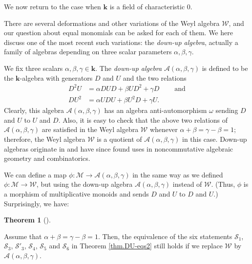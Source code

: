 \documentclass[numbers=enddot,12pt,final,onecolumn,notitlepage]{scrartcl}%
\theoremstyle{definition}
\newtheorem{theo}{Theorem}[section]
\newenvironment{theorem}[1][]
{\begin{theo}[#1]\begin{leftbar}}
{\end{leftbar}\end{theo}}
\newcommand{\W}{\mathcal{W}}
\newcommand{\M}{\mathcal{M}}
\newcommand{\kk}{\mathbf{k}}
\begin{document}
We now return to the case when $\kk$ is a field of characteristic $0$.

There are several deformations and other variations of the Weyl algebra
$\W$, and our question about equal monomials can be asked for each of
them. We  here discuss one of the most recent such variations: the
\emph{down-up algebra}, actually a family of algebras depending on three
scalar parameters $\alpha,\beta,\gamma$.

We fix three scalars $\alpha,\beta,\gamma\in\kk$. The \emph{down-up
algebra} $\mathcal{A}\left(  \alpha,\beta,\gamma\right)  $ is defined to be
the $\kk$-algebra with generators $D$ and $U$ and the two relations%
\begin{align*}
D^{2}U  & =\alpha DUD+\beta UD^{2}+\gamma D\ \ \ \ \ \ \ \ \ \ \text{and}\\
DU^{2}  & =\alpha UDU+\beta U^{2}D+\gamma U.
\end{align*}
Clearly, this algebra $\mathcal{A}\left(  \alpha,\beta,\gamma\right)  $ has an
algebra anti-automorphism $\omega$ sending $D$ and $U$ to $U$ and $D$. Also,
it is easy to check that the above two relations of $\mathcal{A}\left(
\alpha,\beta,\gamma\right)  $ are satisfied in the Weyl algebra $\W$
whenever $\alpha+\beta=\gamma-\beta=1$; therefore, the Weyl algebra
$\W$ is a quotient of $\mathcal{A}\left(  \alpha,\beta,\gamma\right)
$ in this case. Down-up algebras originate in \cite[Proposition 3.5]{BenRob98}
and have since found uses in noncommutative algebraic geometry and combinatorics.

We can define a map $\phi : \M \to \mathcal{A}\left(
\alpha,\beta,\gamma\right)  $ in the same way as we defined $\phi
: \M \to \W$, but using the down-up algebra
$\mathcal{A}\left(  \alpha,\beta,\gamma\right)  $ instead of $\W$.
(Thus, $\phi$ is a morphism of multiplicative monoids and sends $D$ and $U$ to
$D$ and $U$.) Surprisingly, we have:

\begin{theorem}
\label{thm.dua.equiv}
Assume that $\alpha+\beta=\gamma-\beta=1$. Then, the
equivalence of the six statements $\mathcal{S}_{1}$, $\mathcal{S}_{3}$,
$\mathcal{S}'_3$, $\mathcal{S}_{4}$, $\mathcal{S}_{5}$ and $\mathcal{S}_6$
in Theorem \ref{thm.DU-eqs2} still holds if we replace $\W$ by
$\mathcal{A} \left(  \alpha,\beta,\gamma\right)  $.
\end{theorem}
\end{document}
